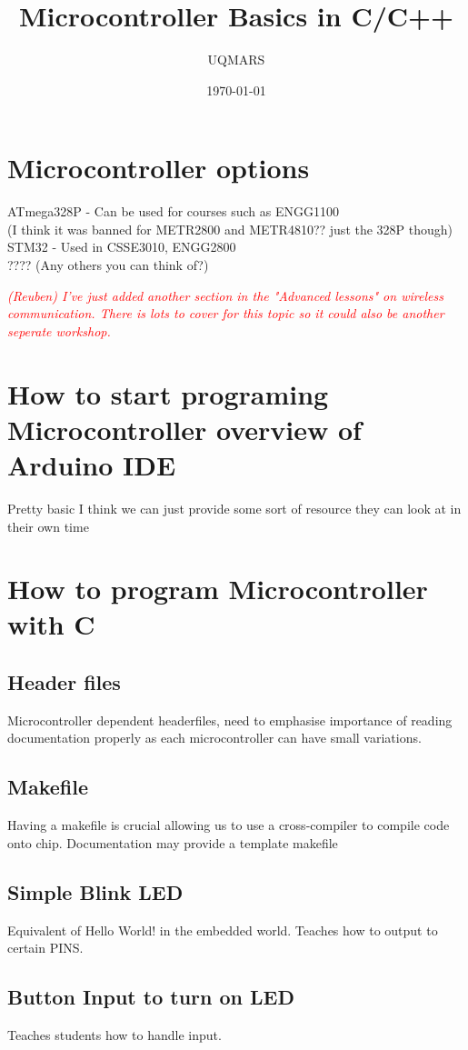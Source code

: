 \documentclass[11pt]{article}
\title{Microcontroller Basics in C/C++}
\author{UQMARS}
\date{\today}
\begin{document}
\maketitle
\pagebreak
\section*{Microcontroller options}
ATmega328P - Can be used for courses such as ENGG1100\\ (I think it was banned for METR2800 and METR4810?? just the 328P though)
STM32 - Used in CSSE3010, ENGG2800\\
???? (Any others you can think of?)

\textcolor{red}{\emph{(Reuben)
    I've just added another section in the "Advanced lessons" on wireless communication.
    There is lots to cover for this topic so it could also be another seperate workshop. 
}}

\section*{How to start programing Microcontroller overview of Arduino IDE}
Pretty basic I think we can just provide some sort of resource they can look at in their own time
\section*{How to program Microcontroller with C}
\subsection*{Header files}
Microcontroller dependent headerfiles, need to emphasise importance of reading documentation properly
as each microcontroller can have small variations.
\subsection*{Makefile}
Having a makefile is crucial allowing us to use a cross-compiler to compile code onto chip.
Documentation may provide a template makefile
\subsection*{Simple Blink LED}
Equivalent of Hello World! in the embedded world. Teaches how to output to certain PINS.
\subsection*{Button Input to turn on LED}
Teaches students how to handle input.
\end{document}
